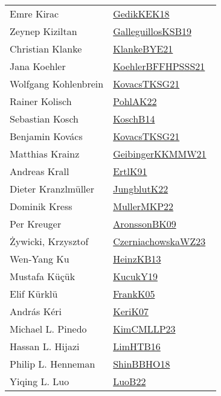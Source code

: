 {\begin{longtable}{p{4cm}p{20cm}}
Emre Kirac & \href{works/GedikKEK18.pdf}{GedikKEK18}~\cite{GedikKEK18}\\
Zeynep Kiziltan & \href{works/GalleguillosKSB19.pdf}{GalleguillosKSB19}~\cite{GalleguillosKSB19}\\
Christian Klanke & \href{works/KlankeBYE21.pdf}{KlankeBYE21}~\cite{KlankeBYE21}\\
Jana Koehler & \href{works/KoehlerBFFHPSSS21.pdf}{KoehlerBFFHPSSS21}~\cite{KoehlerBFFHPSSS21}\\
Wolfgang Kohlenbrein & \href{works/KovacsTKSG21.pdf}{KovacsTKSG21}~\cite{KovacsTKSG21}\\
Rainer Kolisch & \href{works/PohlAK22.pdf}{PohlAK22}~\cite{PohlAK22}\\
Sebastian Kosch & \href{works/KoschB14.pdf}{KoschB14}~\cite{KoschB14}\\
Benjamin Kov{\'{a}}cs & \href{works/KovacsTKSG21.pdf}{KovacsTKSG21}~\cite{KovacsTKSG21}\\
Matthias Krainz & \href{works/GeibingerKKMMW21.pdf}{GeibingerKKMMW21}~\cite{GeibingerKKMMW21}\\
Andreas Krall & \href{works/ErtlK91.pdf}{ErtlK91}~\cite{ErtlK91}\\
Dieter Kranzlm{\"{u}}ller & \href{works/JungblutK22.pdf}{JungblutK22}~\cite{JungblutK22}\\
Dominik Kress & \href{works/MullerMKP22.pdf}{MullerMKP22}~\cite{MullerMKP22}\\
Per Kreuger & \href{works/AronssonBK09.pdf}{AronssonBK09}~\cite{AronssonBK09}\\
Żywicki, Krzysztof & \href{works/CzerniachowskaWZ23.pdf}{CzerniachowskaWZ23}~\cite{CzerniachowskaWZ23}\\
Wen{-}Yang Ku & \href{works/HeinzKB13.pdf}{HeinzKB13}~\cite{HeinzKB13}\\
Mustafa K{\"u}ç{\"u}k & \href{works/KucukY19.pdf}{KucukY19}~\cite{KucukY19}\\
Elif K{\"{u}}rkl{\"{u}} & \href{works/FrankK05.pdf}{FrankK05}~\cite{FrankK05}\\
Andr{\'{a}}s K{\'{e}}ri & \href{works/KeriK07.pdf}{KeriK07}~\cite{KeriK07}\\
Michael L. Pinedo & \href{works/KimCMLLP23.pdf}{KimCMLLP23}~\cite{KimCMLLP23}\\
Hassan L. Hijazi & \href{works/LimHTB16.pdf}{LimHTB16}~\cite{LimHTB16}\\
Philip L. Henneman & \href{works/ShinBBHO18.pdf}{ShinBBHO18}~\cite{ShinBBHO18}\\
Yiqing L. Luo & \href{works/LuoB22.pdf}{LuoB22}~\cite{LuoB22}\\

\end{longtable}}

